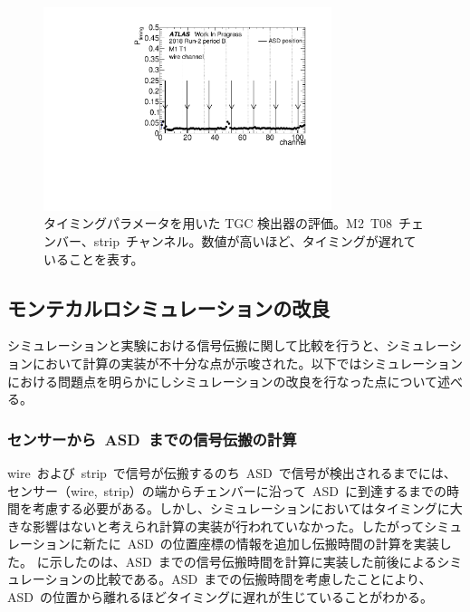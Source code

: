 \begin{figure}[H]
        \centering   
        \includegraphics[width=0.75\textwidth,page=21]{img/pdf5/master_timingplot_data.pdf}
        \caption[タイミングパラメータを用いた TGC 検出器の評価]{タイミングパラメータを用いた TGC 検出器の評価。M2~T08~チェンバー、strip~チャンネル。数値が高いほど、タイミングが遅れていることを表す。}
        \label{fig:timingex}
\end{figure}

\subsection{モンテカルロシミュレーションの改良}
\label{sec:imp}
シミュレーションと実験における信号伝搬に関して比較を行うと、シミュレーションにおいて計算の実装が不十分な点が示唆された。以下ではシミュレーションにおける問題点を明らかにしシミュレーションの改良を行なった点について述べる。

\subsubsection{センサーから~ASD~までの信号伝搬の計算}
wire~および~strip~で信号が伝搬するのち~ASD~で信号が検出されるまでには、センサー（wire,~strip）の端からチェンバーに沿って~ASD~に到達するまでの時間を考慮する必要がある。しかし、シミュレーションにおいてはタイミングに大きな影響はないと考えられ計算の実装が行われていなかった。したがってシミュレーションに新たに~ASD~の位置座標の情報を追加し伝搬時間の計算を実装した。
に示したのは、ASD~までの信号伝搬時間を計算に実装した前後によるシミュレーションの比較である。ASD~までの伝搬時間を考慮したことにより、ASD~の位置から離れるほどタイミングに遅れが生じていることがわかる。

